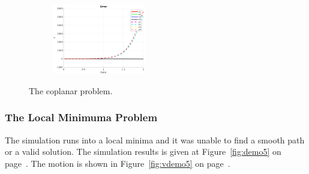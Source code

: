 \documentclass[a4paper,12pt]{article}
\begin{document}
\begin{figure}[t!]
\begin{subfigure}[b]{0.2\textwidth}
		 \end{subfigure}%
         \begin{subfigure}[b]{0.32\textwidth}
        	\centering
	        \includegraphics[height=1.2in]{../results/Demo4-error.png}
		 \end{subfigure}%
         \caption{The coplanar problem.}
 	\label{fig:demo4} 
\end{figure}

\subsubsection{The Local Minimuma Problem}
The simulation runs into  a local minima and it was unable to find a smooth path or a valid solution.
The simulation results is given at Figure~\ref{fig:demo5} on page~\pageref{fig:demo5}. The motion is shown in Figure~\ref{fig:vdemo5} on page~\pageref{fig:vdemo5}.
\end{document}
